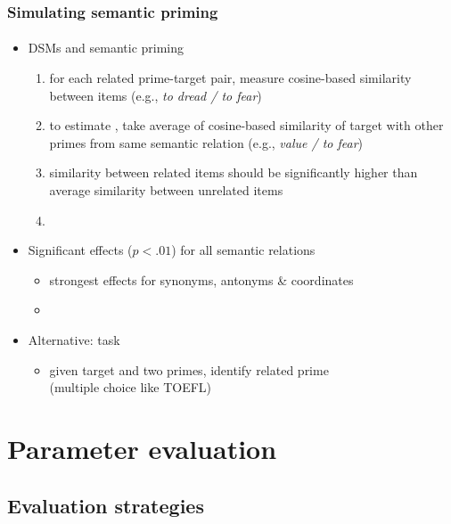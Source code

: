 \documentclass[t]{beamer} %
\begin{document}
\begin{frame}
  \frametitle{Simulating semantic priming}
  \framesubtitle{\citet{McDonald:Brew:04,Pado:Lapata:07}}
 \begin{itemize}
 \item DSMs and semantic priming
  \begin{enumerate}
  \item for each related prime-target pair, 
  measure cosine-based similarity between items (e.g.,
    \emph{to dread / to fear})
    \pause
  \item to estimate , take average of cosine-based similarity of target with other primes from same semantic relation (e.g., \emph{value / to fear})
    \pause
  \item similarity between related items should be significantly higher
    than average similarity between unrelated items
    \item[]
  \end{enumerate}
\item<2-> Significant effects ($p < .01$) for all semantic relations 
  \begin{itemize}
  \item strongest effects for synonyms, antonyms \& coordinates
  \item[]
  \end{itemize}
\item<3-> Alternative:  task
  \begin{itemize}
  \item given target and two primes, identify related prime\\ (\so multiple choice like TOEFL)
  \end{itemize}
  \end{itemize}
\end{frame}


\section{Parameter evaluation}

\subsection{Evaluation strategies}
\end{document}
